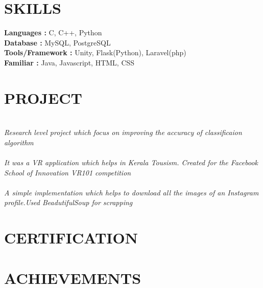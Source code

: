 \documentclass[margin]{res}
\begin{document}
\begin{resume}
\section{SKILLS}

    \textbf{Languages : }C, C++, Python
    \\
    \textbf{Database \hspace{6 px}:} MySQL, PostgreSQL
    \\
    \textbf{Tools/Framework : } Unity, Flask(Python), Laravel(php)
    \\
    \textbf{Familiar : } Java, Javascript, HTML, CSS

\section{PROJECT} 
    \sl \normalfont {} \\ Research level project which focus on improving the accuracy of classificaion algorithm
    \\
    \normalfont {} \\ 
     It was a VR application which helps in Kerala Tousism. Created for the Facebook School of Innovation VR101 competition
     \\
     \normalfont {} \\ 
     A simple implementation which helps to download all the images of an Instagram profile.Used BeadutifulSoup for scrapping

\section{CERTIFICATION}
   
\section{ACHIEVEMENTS}

\end{resume}
\end{document}
